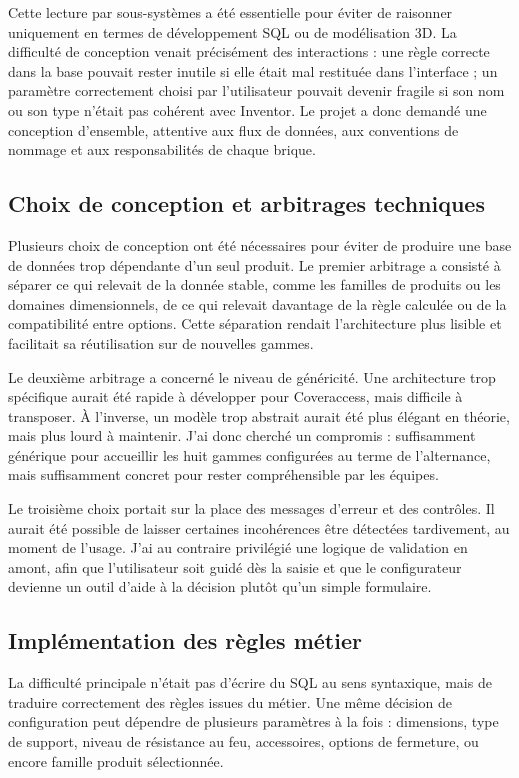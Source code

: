 Cette lecture par sous-systèmes a été essentielle pour éviter de raisonner uniquement en termes de développement SQL ou de modélisation 3D. La difficulté de conception venait précisément des interactions : une règle correcte dans la base pouvait rester inutile si elle était mal restituée dans l'interface ; un paramètre correctement choisi par l'utilisateur pouvait devenir fragile si son nom ou son type n'était pas cohérent avec Inventor. Le projet a donc demandé une conception d'ensemble, attentive aux flux de données, aux conventions de nommage et aux responsabilités de chaque brique.

\subsection{Choix de conception et arbitrages techniques}

Plusieurs choix de conception ont été nécessaires pour éviter de produire une base de données trop dépendante d'un seul produit. Le premier arbitrage a consisté à séparer ce qui relevait de la donnée stable, comme les familles de produits ou les domaines dimensionnels, de ce qui relevait davantage de la règle calculée ou de la compatibilité entre options. Cette séparation rendait l'architecture plus lisible et facilitait sa réutilisation sur de nouvelles gammes.

Le deuxième arbitrage a concerné le niveau de généricité. Une architecture trop spécifique aurait été rapide à développer pour Coveraccess, mais difficile à transposer. À l'inverse, un modèle trop abstrait aurait été plus élégant en théorie, mais plus lourd à maintenir. J'ai donc cherché un compromis : suffisamment générique pour accueillir les huit gammes configurées au terme de l'alternance, mais suffisamment concret pour rester compréhensible par les équipes.

Le troisième choix portait sur la place des messages d'erreur et des contrôles. Il aurait été possible de laisser certaines incohérences être détectées tardivement, au moment de l'usage. J'ai au contraire privilégié une logique de validation en amont, afin que l'utilisateur soit guidé dès la saisie et que le configurateur devienne un outil d'aide à la décision plutôt qu'un simple formulaire.

\subsection{Implémentation des règles métier}

La difficulté principale n'était pas d'écrire du SQL au sens syntaxique, mais de traduire correctement des règles issues du métier. Une même décision de configuration peut dépendre de plusieurs paramètres à la fois : dimensions, type de support, niveau de résistance au feu, accessoires, options de fermeture, ou encore famille produit sélectionnée.

